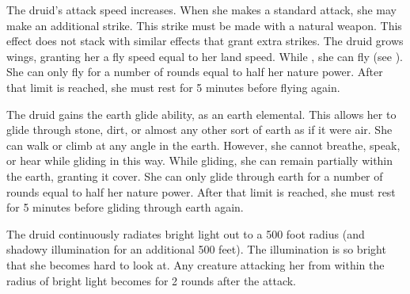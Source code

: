         The druid's attack speed increases.
        When she makes a standard attack, she may make an additional strike.
        This strike must be made with a natural weapon.
        This effect does not stack with similar effects that grant extra strikes.
        The druid grows wings, granting her a fly speed equal to her land speed.
        While \unencumbered, she can fly (see ).
        She can only fly for a number of rounds equal to half her nature power.
        After that limit is reached, she must rest for 5 minutes before flying again.

        The druid gains the earth glide ability, as an earth elemental.
        This allows her to glide through stone, dirt, or almost any other sort of earth as if it were air.
        She can walk or climb at any angle in the earth.
        However, she cannot breathe, speak, or hear while gliding in this way.
        While gliding, she can remain partially within the earth, granting it cover.
        She can only glide through earth for a number of rounds equal to half her nature power.
        After that limit is reached, she must rest for 5 minutes before gliding through earth again.

        The druid continuously radiates bright light out to a 500 foot radius (and shadowy illumination for an additional 500 feet).
        The illumination is so bright that she becomes hard to look at.
        Any creature attacking her from within the radius of bright light becomes \partiallyblinded for 2 rounds after the attack.

